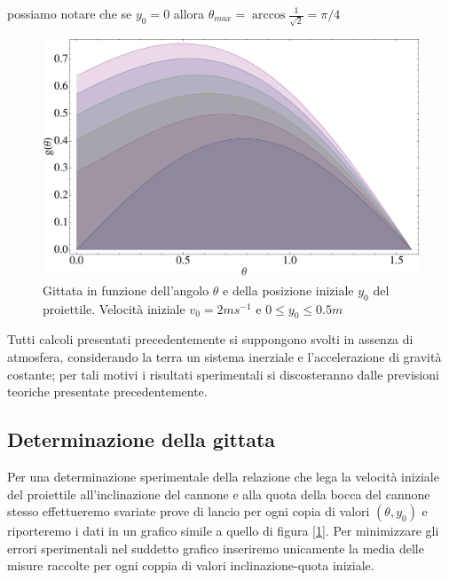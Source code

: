 \documentclass[a4paper,10pt,oneside]{article}
\begin{document}
possiamo notare che se $y_0=0$ allora $\theta_{max}=\arccos\frac{1}{\sqrt 2}=\pi/4$ 
\begin{figure}[H]
 \centering
 \includegraphics[width=\textwidth]{./Immagini/gittata1.pdf}
 \caption{Gittata in funzione dell'angolo $\theta$ e della posizione iniziale $y_0$ del proiettile. Velocità iniziale $v_0=2ms^{-1}$ e $0\leq y_0\leq 0.5 m$}
 \label{fig:gittata_variazione}
\end{figure}

Tutti calcoli presentati precedentemente si suppongono svolti in assenza di atmosfera, considerando la terra un sistema inerziale e l'accelerazione di gravità costante; per tali motivi i risultati sperimentali si discosteranno dalle previsioni teoriche presentate precedentemente.

\subsection*{Determinazione della gittata}

Per una determinazione sperimentale della relazione che lega la velocità iniziale del proiettile all'inclinazione del cannone e alla quota della bocca del cannone stesso effettueremo svariate prove di lancio per ogni copia di valori $(\theta,y_0)$ e riporteremo i dati in un grafico simile a quello di figura [\ref{fig:gittata_variazione}]. Per minimizzare gli errori sperimentali nel suddetto grafico inseriremo unicamente la media delle misure raccolte per ogni coppia di valori inclinazione-quota iniziale.
\end{document}
